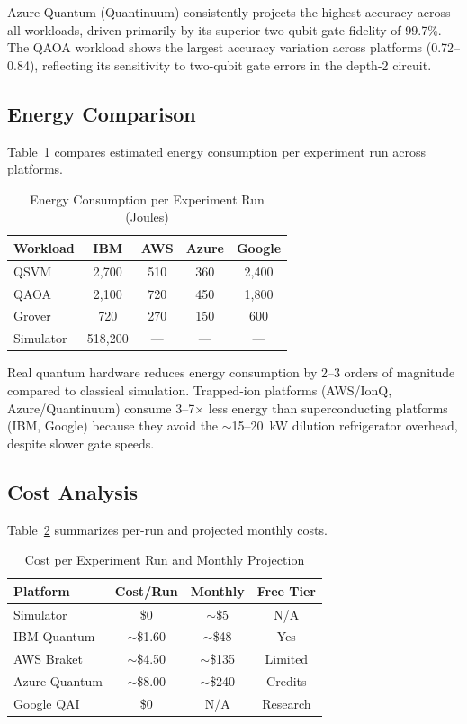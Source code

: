 \documentclass[conference]{IEEEtran}
\begin{document}
Azure Quantum (Quantinuum) consistently projects the highest accuracy across all workloads, driven primarily by its superior two-qubit gate fidelity of 99.7\%. The QAOA workload shows the largest accuracy variation across platforms (0.72--0.84), reflecting its sensitivity to two-qubit gate errors in the depth-2 circuit.

\subsection{Energy Comparison}

Table~\ref{tab:energy} compares estimated energy consumption per experiment run across platforms.

\begin{table}[htbp]
\caption{Energy Consumption per Experiment Run (Joules)}
\label{tab:energy}
\centering
\begin{tabular}{lcccc}
\toprule
\textbf{Workload} & \textbf{IBM} & \textbf{AWS} & \textbf{Azure} & \textbf{Google} \\
\midrule
QSVM & 2,700 & 510 & 360 & 2,400 \\
QAOA & 2,100 & 720 & 450 & 1,800 \\
Grover & 720 & 270 & 150 & 600 \\
\midrule
Simulator & 518,200 & --- & --- & --- \\
\bottomrule
\end{tabular}
\end{table}

Real quantum hardware reduces energy consumption by 2--3 orders of magnitude compared to classical simulation. Trapped-ion platforms (AWS/IonQ, Azure/Quantinuum) consume 3--7$\times$ less energy than superconducting platforms (IBM, Google) because they avoid the $\sim$15--20~kW dilution refrigerator overhead, despite slower gate speeds.

\subsection{Cost Analysis}

Table~\ref{tab:cost} summarizes per-run and projected monthly costs.

\begin{table}[htbp]
\caption{Cost per Experiment Run and Monthly Projection}
\label{tab:cost}
\centering
\begin{tabular}{lccc}
\toprule
\textbf{Platform} & \textbf{Cost/Run} & \textbf{Monthly} & \textbf{Free Tier} \\
\midrule
Simulator & \$0 & $\sim$\$5 & N/A \\
IBM Quantum & $\sim$\$1.60 & $\sim$\$48 & Yes \\
AWS Braket & $\sim$\$4.50 & $\sim$\$135 & Limited \\
Azure Quantum & $\sim$\$8.00 & $\sim$\$240 & Credits \\
Google QAI & \$0 & N/A & Research \\
\bottomrule
\end{tabular}
\end{table}
\end{document}
